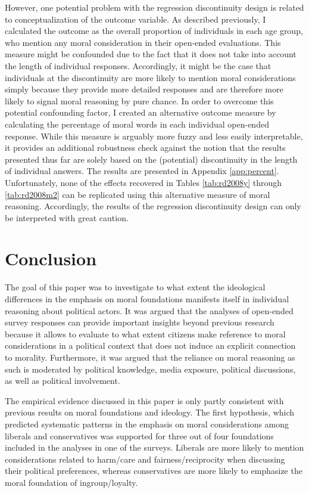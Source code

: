 \documentclass[12pt]{article}
\begin{document}
However, one potential problem with the regression discontinuity design is related to conceptualization of the outcome variable. As described previously, I calculated the outcome as the overall proportion of individuals in each age group, who mention any moral consideration in their open-ended evaluations. This measure might be confounded due to the fact that it does not take into account the length of individual responses. Accordingly, it might be the case that individuals at the discontinuity are more likely to mention moral considerations simply because they provide more detailed responses and are therefore more likely to signal moral reasoning by pure chance. In order to overcome this potential confounding factor, I created an alternative outcome measure by calculating the percentage of moral words in each individual open-ended response. While this measure is arguably more fuzzy and less easily interpretable, it provides an additional robustness check against the notion that the results presented thus far are solely based on the (potential) discontinuity in the length of individual answers. The results are presented in Appendix \ref{app:percent}. Unfortunately, none of the effects recovered in Tables \ref{tab:rd2008y} through \ref{tab:rd2008m2} can be replicated using this alternative measure of moral reasoning. Accordingly, the results of the regression discontinuity design can only be interpreted with great caution.


\section{Conclusion}

The goal of this paper was to investigate to what extent the ideological differences in the emphasis on moral foundations manifests itself in individual reasoning about political actors. It was argued that the analyses of open-ended survey responses can provide important insights beyond previous research because it allows to evaluate to what extent citizens make reference to moral considerations in a political context that does not induce an explicit connection to morality. Furthermore, it was argued that the reliance on moral reasoning as such is moderated by political knowledge, media exposure, political discussions, as well as political involvement.

The empirical evidence discussed in this paper is only partly consistent with previous results on moral foundations and ideology. The first hypothesis, which predicted systematic patterns in the emphasis on moral considerations among liberals and conservatives was supported for three out of four foundations included in the analyses in one of the surveys. Liberals are more likely to mention considerations related to harm/care and fairness/reciprocity when discussing their political preferences, whereas conservatives are more likely to emphasize the moral foundation of ingroup/loyalty.
\end{document}
